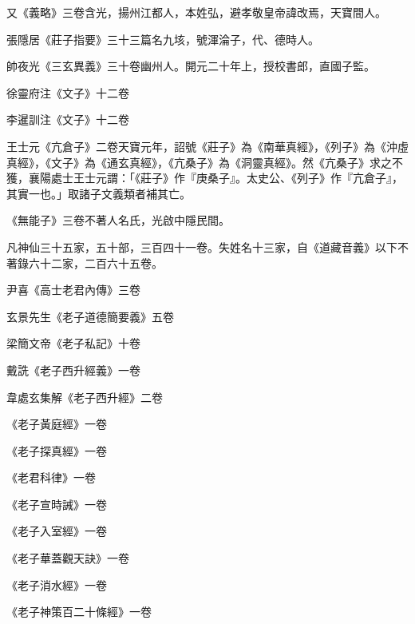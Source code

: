 \begin{pinyinscope}
 又《義略》三卷含光，揚州江都人，本姓弘，避孝敬皇帝諱改焉，天寶間人。



 張隱居《莊子指要》三十三篇名九垓，號渾淪子，代、德時人。



 帥夜光《三玄異義》三十卷幽州人。開元二十年上，授校書郎，直國子監。



 徐靈府注《文子》十二卷



 李暹訓注《文子》十二卷



 王士元《亢倉子》二卷天寶元年，詔號《莊子》為《南華真經》，《列子》為《沖虛真經》，《文子》為《通玄真經》，《亢桑子》為《洞靈真經》。然《亢桑子》求之不獲，襄陽處士王士元謂：「《莊子》作『庚桑子』。太史公、《列子》作『亢倉子』，其實一也。」取諸子文義類者補其亡。



 《無能子》三卷不著人名氏，光啟中隱民間。



 凡神仙三十五家，五十部，三百四十一卷。失姓名十三家，自《道藏音義》以下不著錄六十二家，二百六十五卷。



 尹喜《高士老君內傳》三卷



 玄景先生《老子道德簡要義》五卷



 梁簡文帝《老子私記》十卷



 戴詵《老子西升經義》一卷



 韋處玄集解《老子西升經》二卷



 《老子黃庭經》一卷



 《老子探真經》一卷



 《老君科律》一卷



 《老子宣時誡》一卷



 《老子入室經》一卷



 《老子華蓋觀天訣》一卷



 《老子消水經》一卷



 《老子神策百二十條經》一卷




\end{pinyinscope}
